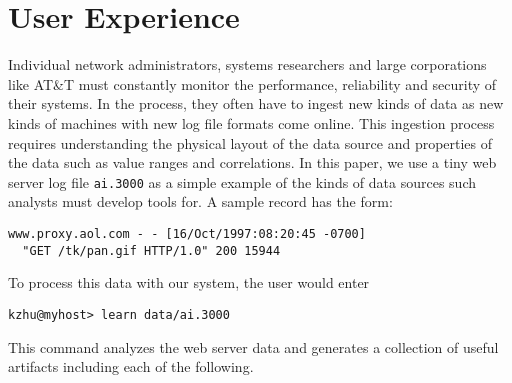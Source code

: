 \documentclass{sig-alt-release2}
\begin{document}
\section{User Experience}

Individual network administrators, systems researchers and large 
corporations like AT\&T must constantly monitor the performance,
reliability and security of their systems.
In the process, they often have to ingest new kinds of data
as new kinds of machines with new log file formats come
online.  This ingestion process requires understanding the physical
layout of the data source and properties of the data such as value
ranges and correlations.  In this paper, we use a tiny
web server log file {\tt ai.3000} as a simple example of the kinds of
data sources such analysts must develop tools for. A sample record has
the form:

{\small
\begin{verbatim}
www.proxy.aol.com - - [16/Oct/1997:08:20:45 -0700] 
  "GET /tk/pan.gif HTTP/1.0" 200 15944
\end{verbatim}
}

\noindent
To process this data with our system, the user would enter


{\small
\begin{verbatim}
kzhu@myhost> learn data/ai.3000 
\end{verbatim}
}

\noindent
This command analyzes the web server data and generates a collection
of useful artifacts including each of the following.
\end{document}
